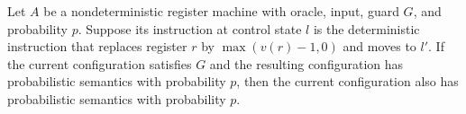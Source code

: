 \begin{lemma}
\label{Complexity.LogProg.PSem.dec}
\leanok
{}
Let $A$ be a nondeterministic register machine with oracle, input, guard $G$, and
probability $p$. Suppose its instruction at control state $l$ is the deterministic
instruction that replaces register $r$ by $\max(v(r)-1,0)$ and moves to $l'$. If the
current configuration satisfies $G$ and the resulting configuration has probabilistic
semantics with probability $p$, then the current configuration also has probabilistic
semantics with probability $p$.
\end{lemma}
